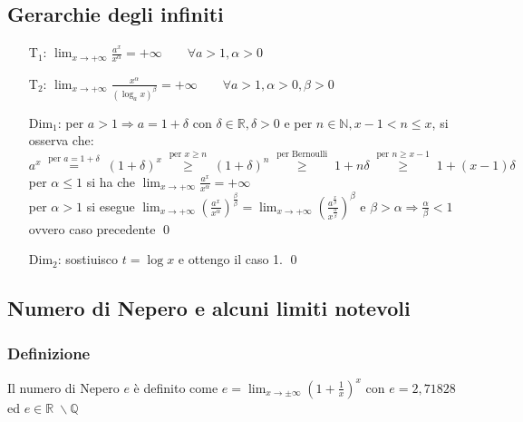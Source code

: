 \documentclass[a4paper]{article}
\begin{document}
\subsection{Gerarchie degli infiniti}
\begin{itemize}
	\item[T\(_1\):] \(\displaystyle \lim_{x \to + \infty} \frac{a^x}{x^\alpha} = + \infty \qquad \forall a > 1, \alpha > 0\)
	\item[T\(_2\):] \(\displaystyle \lim_{x \to + \infty} \frac{x^\alpha}{\left( \log_a x \right) ^ \beta} = + \infty \qquad \forall a > 1, \alpha > 0, \beta > 0\)
	\item[Dim\(_1\):] per \(a > 1 \Rightarrow a = 1 + \delta\) con \(\delta \in \mathbb{R}, \delta > 0\) e per \(n \in \mathbb{N}, x-1 < n \leq x\), si osserva che: \\
	\(a^x \; \stackrel{\text{per }a=1+\delta}{=} \; (1 + \delta)^x \; \stackrel{\text{per }x \geq n}{\geq} \; (1 + \delta)^n \; \stackrel{\text{per Bernoulli}}{\geq} \; 1 + n \delta \; \stackrel{\text{per } n \geq x-1}{\geq} \; 1 + (x-1) \delta\) \\
	per \(\alpha \leq 1\) si ha che \(\displaystyle \lim_{x \to + \infty} \frac{a^x}{x^\alpha} = + \infty\) \\
	per \(\alpha > 1\) si esegue \(\displaystyle \lim_{x \to + \infty} \left(\frac{a^x}{x^\alpha}\right)^\frac{\beta}{\beta} = \lim_{x \to + \infty} \left(\frac{a^\frac{x}{\beta}}{x^\frac{\alpha}{\beta}}\right)^\beta\)
	e \(\displaystyle \beta > \alpha \Rightarrow \frac{\alpha}{\beta} < 1\) ovvero caso precedente \qed
	\item[Dim\(_2\):] sostiuisco \(t = \log x\) e ottengo il caso 1. \qed
\end{itemize}

\newpage

\subsection{Numero di Nepero e alcuni limiti notevoli}
\subsubsection*{Definizione}
Il numero di Nepero \(e\) è definito come \(\displaystyle e = \lim_{x \to \pm \infty} \left( 1 + \frac{1}{x} \right) ^ x\)
con \(e = 2,71828\) ed \(e \in \mathbb{R} \; \backslash \mathbb{Q}\)
\end{document}
